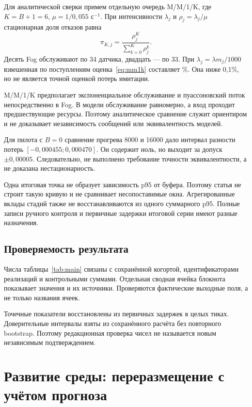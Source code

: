 \documentclass{psta}
\begin{document}
Для аналитической сверки примем отдельную очередь M/M/1/K, где $K=B+1=6$, $\mu=1/0{,}055$ с$^{-1}$. При интенсивности $\lambda_j$ и $\rho_j=\lambda_j/\mu$ стационарная доля отказов равна
\begin{equation}\label{eq:mm1k}
 \pi_{K,j}=\frac{\rho_j^K}{\sum_{k=0}^{K}\rho_j^k}.
\end{equation}
Десять Fog обслуживают по 34 датчика, двадцать --- по 33. При $\lambda_j=\lambda m_j/1000$ взвешенная по поступлениям оценка~\eqref{eq:mm1k} составляет \cQueuePercent{}\%. Она ниже 0,1\%, но не является точной оценкой потерь имитации.

M/M/1/K предполагает экспоненциальное обслуживание и пуассоновский поток непосредственно в Fog. В модели обслуживание равномерно, а вход проходит предшествующие ресурсы. Поэтому аналитическое сравнение служит ориентиром и не доказывает независимость сообщений или эквивалентность моделей.

Для пилота с $B=0$ сравнение прогрева 8000 и 16000 дало интервал разности потерь $[-0{,}000455;0{,}000470]$. Он содержит ноль, но выходит за допуск $\pm0{,}00005$. Следовательно, не выполнено требование точности эквивалентности, а не доказана нестационарность.

Одна итоговая точка не образует зависимость p95 от буфера. Поэтому статья не строит такую кривую и не сравнивает несопоставимые окна. Агрегированные вклады стадий также не восстанавливаются из одного суммарного p95. Полные записи ручного контроля и первичные задержки итоговой серии имеют разные назначения.

\subsection{Проверяемость результата}
Числа таблицы~\ref{tab:main} связаны с сохранённой когортой, идентификаторами реализаций и контрольными суммами. Отдельная сводная ячейка блокнота показывает значения и их источники. Проверяются фактические выходные поля, а не только названия ячеек.

Точечные показатели восстановлены из первичных задержек в целых тиках. Доверительные интервалы взяты из сохранённого расчёта без повторного bootstrap. Поэтому редакционная проверка чисел не называется новым независимым подтверждением.

\section{Развитие среды: переразмещение с учётом прогноза}\label{sec:development}
\end{document}
